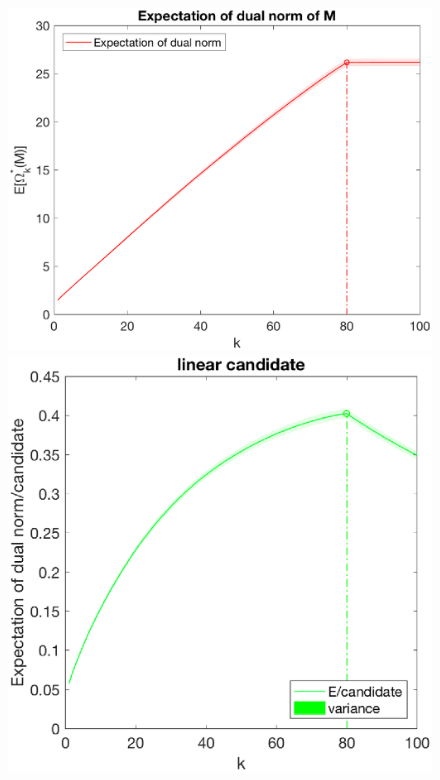 \documentclass[12pt]{article}
\begin{document}
\begin{figure}[h]
    \begin{minipage}[c]{.3\linewidth}
        \centering
        \includegraphics[width=\linewidth]{Fig/dualnorm-u0ones-k0-80.eps}
    \end{minipage}
    \hfill%
    \begin{minipage}[c]{.3\linewidth}
        \centering
        \includegraphics[width=\linewidth]{Fig/dualnorm-u0ones-k0-80-candidatelin.eps}

\end{minipage}
\end{figure}
\end{document}
